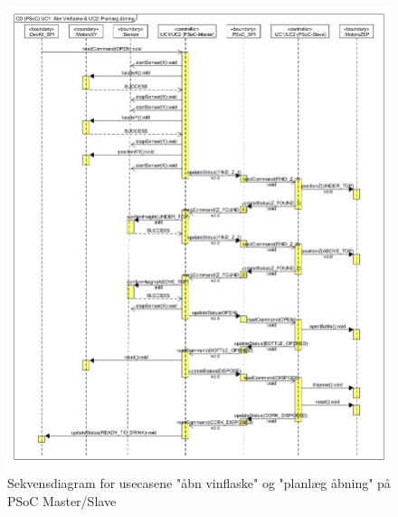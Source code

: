 \begin{figure}[H]
\includegraphics[scale=0.4]{tex/Arkitektur/Fotos/SW/Sekvendiagram_PSoC}
\caption{Sekvensdiagram for usecasene "åbn vinflaske" og "planlæg åbning" på PSoC Master/Slave}
\end{figure}
